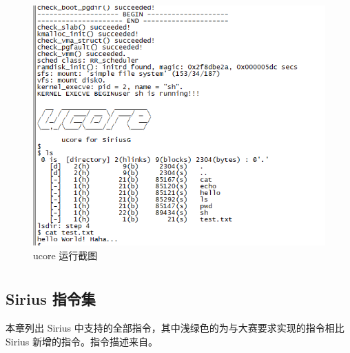 \documentclass[blue,normal,cn,hide]{elegantbook}
\begin{document}
\begin{figure}[htpb]
    \centering
    \includegraphics[width=.6\textwidth]{figures/ucore}
    \caption{ucore 运行截图}
    \label{fig:ucore}
\end{figure}

\appendix

\chapter{}
\section{Sirius 指令集}

本章列出 Sirius 中支持的全部指令，其中浅绿色的为与大赛要求实现的指令相比
Sirius 新增的指令。指令描述来自\cite{MIPS2A}。
\end{document}
